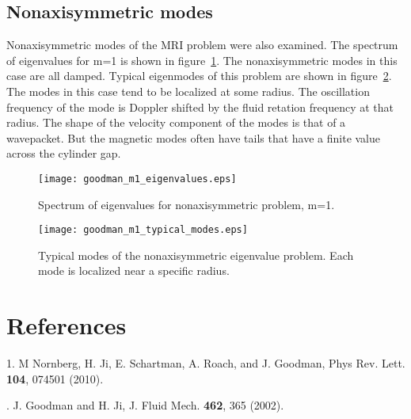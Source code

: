 \documentclass[letterpaper]{article}
\begin{document}
\subsection{Nonaxisymmetric modes}

Nonaxisymmetric modes of the MRI problem were also examined.  The spectrum of eigenvalues for m=1 is shown in figure~\ref{fig:goodmanm1eigenvalues}.  The nonaxisymmetric modes in this case are all damped.  Typical eigenmodes of this problem are shown in figure~\ref{fig:goodmanm1typicalmodes}.  The modes in this case tend to be localized at some radius.  The oscillation frequency of the mode is Doppler shifted by the fluid retation frequency at that radius.  The shape of the velocity component of the modes is that of a wavepacket.  But the magnetic modes often have tails that have a finite value across the cylinder gap.

\begin{figure}
\begin{center}
\texttt{[image: goodman\_m1\_eigenvalues.eps]}
\caption{Spectrum of eigenvalues for nonaxisymmetric problem, m=1.}
\label{fig:goodmanm1eigenvalues}
\end{center}
\end{figure}

\begin{figure}
\begin{center}
\texttt{[image: goodman\_m1\_typical\_modes.eps]}
\caption{Typical modes of the nonaxisymmetric eigenvalue problem.  Each mode is localized near a specific radius.}
\label{fig:goodmanm1typicalmodes}
\end{center}
\end{figure}


\section{References}
1. M Nornberg, H. Ji, E. Schartman, A. Roach, and J. Goodman, Phys Rev. Lett. {\bf 104}, 074501 (2010).

. J. Goodman and H. Ji, J. Fluid Mech. {\bf 462}, 365 (2002).
\end{document}
